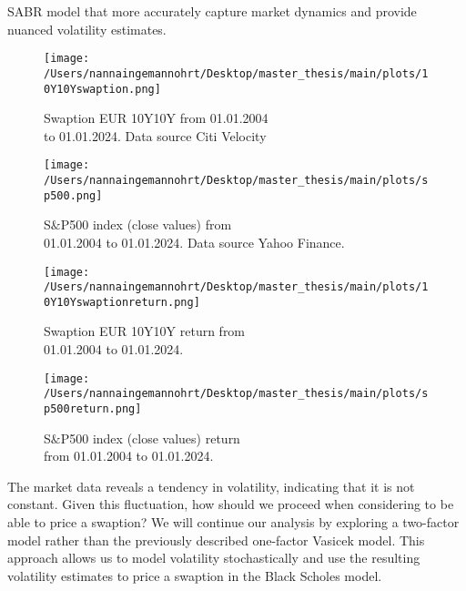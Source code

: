 SABR model that more accurately capture market dynamics and provide nuanced volatility estimates.
\begin{figure}[H]
    \centering
    \begin{minipage}{0.5\textwidth}
        \texttt{[image: /Users/nannaingemannohrt/Desktop/master\_thesis/main/plots/10Y10Yswaption.png]}
        \caption{Swaption EUR 10Y10Y from 01.01.2004 \\ to 01.01.2024. Data source Citi Velocity }
        \label{10Y10Y dev}
    \end{minipage}\hfill 
    \begin{minipage}{0.5\textwidth}
        \texttt{[image: /Users/nannaingemannohrt/Desktop/master\_thesis/main/plots/sp500.png]}
        \caption{S$\&$P500 index (close values) from \\ 01.01.2004 to 01.01.2024. Data source Yahoo Finance. }
        \label{sp500 dev}
    \end{minipage}
\end{figure}

\begin{figure}[H]
    \centering
    \begin{minipage}{0.5\textwidth}
        \texttt{[image: /Users/nannaingemannohrt/Desktop/master\_thesis/main/plots/10Y10Yswaptionreturn.png]}
        \caption{Swaption EUR 10Y10Y return from  \\ 01.01.2004 to 01.01.2024.}
        \label{10Y10Y return}
    \end{minipage}\hfill 
    \begin{minipage}{0.5\textwidth}
        \texttt{[image: /Users/nannaingemannohrt/Desktop/master\_thesis/main/plots/sp500return.png]}
        \caption{S$\&$P500 index (close values) return  \\ from 01.01.2004 to 01.01.2024.}
        \label{sp500 return}
    \end{minipage}
\end{figure}
\noindent
The market data reveals a tendency in 
volatility, indicating that it is not constant. 
Given this fluctuation, how should we proceed when 
considering to be able to price a swaption? We will continue our 
analysis by exploring a two-factor model rather 
than the previously described one-factor Vasicek model. 
This approach allows us to model volatility 
stochastically and use the resulting volatility 
estimates to price a swaption in the Black Scholes model. 
